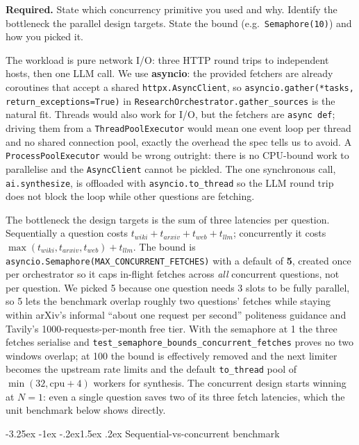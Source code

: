 \documentclass[11pt,a4paper]{article}
\makeatletter
\renewcommand\subsection{\@startsection{subsection}{2}{\z@}%
    {-3.25ex \@plus -1ex \@minus -.2ex}{1.5ex \@plus .2ex}%
    {\normalfont\large\bfseries\color{accent}}}%
\makeatother
\begin{document}
\begin{deliverbox}
\textbf{Required.} State which concurrency primitive you used and why. Identify the bottleneck the parallel design targets. State the bound (e.g.\ \texttt{Semaphore(10)}) and how you picked it.
\end{deliverbox}

The workload is pure network I/O: three HTTP round trips to independent hosts, then one LLM call. We use \textbf{asyncio}: the provided fetchers are already coroutines that accept a shared \texttt{httpx.AsyncClient}, so \texttt{asyncio.gather(*tasks, return\_exceptions=True)} in \texttt{ResearchOrchestrator.gather\_sources} is the natural fit. Threads would also work for I/O, but the fetchers are \texttt{async def}; driving them from a \texttt{ThreadPoolExecutor} would mean one event loop per thread and no shared connection pool, exactly the overhead the spec tells us to avoid. A \texttt{ProcessPoolExecutor} would be wrong outright: there is no CPU-bound work to parallelise and the \texttt{AsyncClient} cannot be pickled. The one synchronous call, \texttt{ai.synthesize}, is offloaded with \texttt{asyncio.to\_thread} so the LLM round trip does not block the loop while other questions are fetching.

The bottleneck the design targets is the sum of three latencies per question. Sequentially a question costs $t_{wiki}+t_{arxiv}+t_{web}+t_{llm}$; concurrently it costs $\max(t_{wiki},t_{arxiv},t_{web})+t_{llm}$. The bound is \texttt{asyncio.Semaphore(MAX\_CONCURRENT\_FETCHES)} with a default of \textbf{5}, created once per orchestrator so it caps in-flight fetches across \emph{all} concurrent questions, not per question. We picked 5 because one question needs 3 slots to be fully parallel, so 5 lets the benchmark overlap roughly two questions' fetches while staying within arXiv's informal ``about one request per second'' politeness guidance and Tavily's 1000-requests-per-month free tier. With the semaphore at 1 the three fetches serialise and \texttt{test\_semaphore\_bounds\_concurrent\_fetches} proves no two windows overlap; at 100 the bound is effectively removed and the next limiter becomes the upstream rate limits and the default \texttt{to\_thread} pool of $\min(32, \text{cpu}+4)$ workers for synthesis. The concurrent design starts winning at $N=1$: even a single question saves two of its three fetch latencies, which the unit benchmark below shows directly.

\subsection{Sequential-vs-concurrent benchmark}
\end{document}
